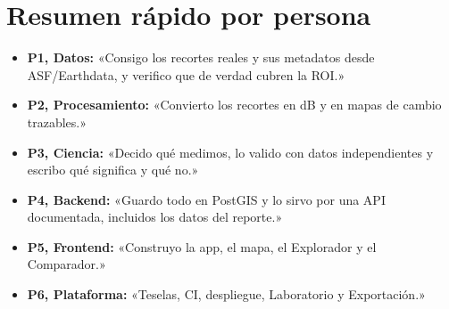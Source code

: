 \documentclass[11pt,a4paper]{article}
\begin{document}
\section{Resumen rápido por persona}

\begin{itemize}
  \item \textbf{P1, Datos:} «Consigo los recortes reales y sus metadatos desde ASF/Earthdata, y verifico que de verdad cubren la ROI.»
  \item \textbf{P2, Procesamiento:} «Convierto los recortes en dB y en mapas de cambio trazables.»
  \item \textbf{P3, Ciencia:} «Decido qué medimos, lo valido con datos independientes y escribo qué significa y qué no.»
  \item \textbf{P4, Backend:} «Guardo todo en PostGIS y lo sirvo por una API documentada, incluidos los datos del reporte.»
  \item \textbf{P5, Frontend:} «Construyo la app, el mapa, el Explorador y el Comparador.»
  \item \textbf{P6, Plataforma:} «Teselas, CI, despliegue, Laboratorio y Exportación.»
\end{itemize}
\end{document}
